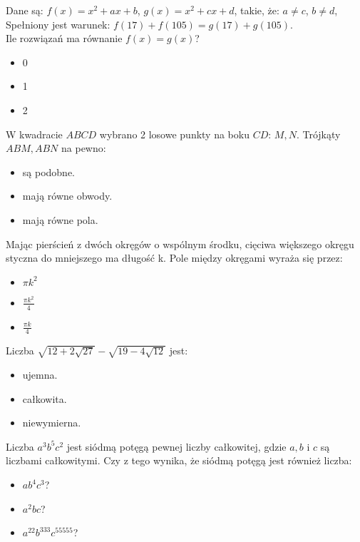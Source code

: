 \documentclass[12pt, a4paper]{article}
\newcommand{\question}[1]{\normalitem \begin{samepage}#1 \end{samepage}}
\newcommand{\questionwithasterix}[1]{ \asterixitem \begin{samepage}#1 \vspace{6cm}\end{samepage}}
\begin{document}
\begin{enumerate}
	\question {
	    Dane są: $f(x) = x^2 + ax + b$, $g(x) = x^2 + cx + d$, takie, że: $a \neq c$, $b \neq d$, \\
	    Spełniony jest warunek: $f(17)+f(105) = g(17) + g(105)$. \\
	    Ile rozwiązań ma równanie $f(x) = g(x)$?
	    
	    \begin{itemize}
	        \item 0
	        \item 1
	        \item 2
	    \end{itemize}
	}
	
	\question {
	    W kwadracie $ABCD$ wybrano 2 losowe punkty na boku $CD$: $M, N$.
	    Trójkąty $ABM, ABN$ na pewno:
	    
	    \begin{itemize}
	        \item są podobne.
	        \item mają równe obwody.
	        \item mają równe pola.
	    \end{itemize}
    }
    
	\question {
	    Mając pierścień z dwóch okręgów o wspólnym środku, cięciwa większego okręgu styczna do mniejszego ma długość k. Pole między okręgami wyraża się przez:
	    
	    \begin{itemize}
	        \item $\pi k^2$
	        \item $\frac{\pi k^2}{4}$
	        \item $\frac{\pi k}{4}$
	    \end{itemize}
	}
	
	\questionwithasterix {
		Liczba $\sqrt{12+2 \sqrt{27}}-\sqrt{19-4\sqrt{12}}$ jest:
		
		\begin{itemize}
			\item ujemna.
			\item całkowita.
			\item niewymierna.
		\end{itemize}
	}
	
	\question{
	    Liczba $a^3b^5c^2$ jest siódmą potęgą pewnej liczby całkowitej, gdzie $a,b$ i $c$ są liczbami całkowitymi. Czy z tego wynika, że siódmą potęgą jest również liczba:
	    
	    \begin{itemize}
	        \item $ab^4c^3$?
	        \item $a^2bc$?
	        \item $a^{22}b^{333}c^{55555}$?
	    \end{itemize}
	}
	

\end{enumerate}
\end{document}
